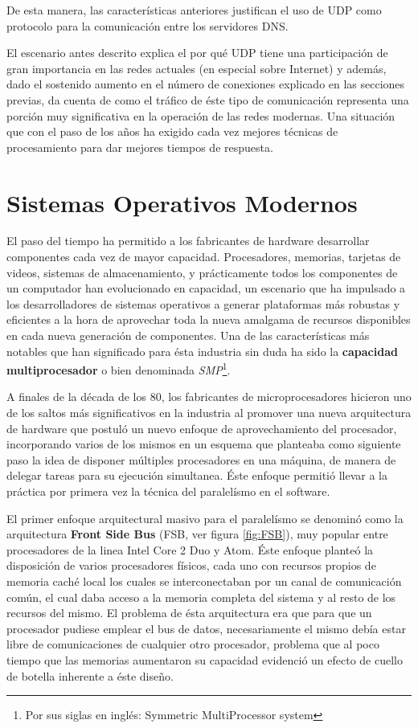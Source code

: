 De esta manera, las características anteriores justifican el uso de UDP como protocolo para la comunicación entre los servidores DNS.

El escenario antes descrito explica el por qué UDP tiene una participación de gran importancia en las redes actuales (en especial sobre Internet) y además, dado el sostenido aumento en el número de conexiones explicado en las secciones previas, da cuenta de como el tráfico de éste tipo de comunicación representa una porción muy significativa en la operación de las redes modernas. Una situación que con el paso de los años ha exigido cada vez mejores técnicas de procesamiento para dar mejores tiempos de respuesta.

\section{Sistemas Operativos Modernos}
El paso del tiempo ha permitido a los fabricantes de hardware desarrollar componentes cada vez de mayor capacidad. Procesadores, memorias, tarjetas de videos, sistemas de almacenamiento, y prácticamente todos los componentes de un computador han evolucionado en capacidad, un escenario que ha impulsado a los desarrolladores de sistemas operativos a generar plataformas más robustas y eficientes a la hora de aprovechar toda la nueva amalgama de recursos disponibles en cada nueva generación de componentes. Una de las características más notables que han significado para ésta industria sin duda ha sido la \textbf{capacidad multiprocesador} o bien denominada \emph{SMP}\footnote{Por sus siglas en inglés: Symmetric MultiProcessor system}.

A finales de la década de los 80, los fabricantes de microprocesadores hicieron uno de los saltos más significativos en la industria al promover una nueva arquitectura de hardware que postuló un nuevo enfoque de aprovechamiento del procesador, incorporando varios de los mismos en un esquema que planteaba como siguiente paso la idea de disponer múltiples procesadores en una máquina, de manera de delegar tareas para su ejecución simultanea. Éste enfoque permitió llevar a la práctica por primera vez la técnica del paralelísmo en el software.

El primer enfoque arquitectural masivo para el paralelísmo se denominó como la arquitectura \textbf{Front Side Bus} (FSB, ver figura \ref{fig:FSB}), muy popular entre procesadores de la linea Intel Core 2 Duo y Atom. Éste enfoque planteó la disposición de varios procesadores físicos, cada uno con recursos propios de memoria caché local los cuales se interconectaban por un canal de comunicación común, el cual daba acceso a la memoria completa del sistema y al resto de los recursos del mismo. El problema de ésta arquitectura era que para que un procesador pudiese emplear el bus de datos, necesariamente el mismo debía estar libre de comunicaciones de cualquier otro procesador, problema que al poco tiempo que las memorias aumentaron su capacidad evidenció un efecto de cuello de botella inherente a éste diseño.

